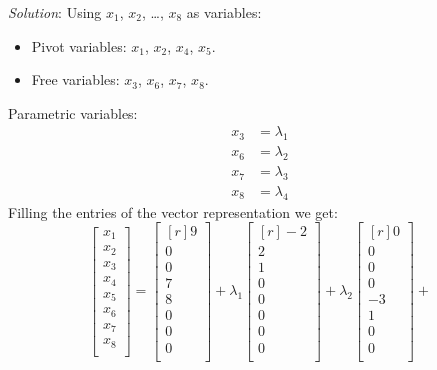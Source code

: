 \documentclass[12pt]{article}
\begin{document}
\begin{enumerate}
\emph{Solution}: Using $x_1$, $x_2$, \dots, $x_8$ as variables:
\begin{itemize}
\item Pivot variables: $x_1$, $x_2$, $x_4$, $x_5$.
\item Free variables: $x_3$, $x_6$, $x_7$, $x_8$.
\end{itemize}
Parametric variables:
\begin{align*}
x_3 &= \lambda_1\\
x_6 &= \lambda_2\\
x_7 &= \lambda_3\\
x_8 &= \lambda_4
\end{align*}
Filling the entries of the vector representation we get:
\[
\begin{bmatrix}     x_1\\ x_2\\ x_3\\ x_4\\ x_5\\ x_6\\ x_7\\ x_8\\\end{bmatrix}=
\begin{bmatrix*}[r]   9\\   0\\   0\\   7\\   8\\   0\\   0\\   0\\\end{bmatrix*}+
\lambda_1
\begin{bmatrix*}[r]  -2\\   2\\   1\\   0\\   0\\   0\\   0\\   0\\\end{bmatrix*}+ 
\lambda_2
\begin{bmatrix*}[r]   0\\   0\\   0\\   0\\  -3\\   1\\   0\\   0\\\end{bmatrix*}+ 
\]
\end{enumerate}
\end{document}
